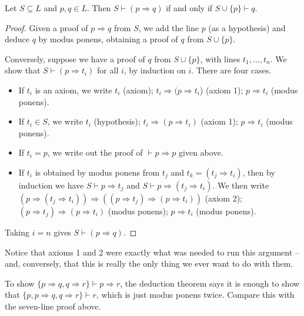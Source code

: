 \begin{theorem}\label{thm:deduction}
  Let $S \subseteq L$ and $p, q \in L$. Then $S \vdash (p \Rightarrow q)$ if and only if $S \cup \{p\} \vdash q$.
\end{theorem}
\begin{proof}
Given a proof of $p \Rightarrow q$ from $S$, we add the line $p$ (as a hypothesis) and deduce $q$ by modus ponens, obtaining a proof of $q$ from $S \cup \{p\}$.

Conversely, suppose we have a proof of $q$ from $S \cup\{p\}$, with lines $t_1, \ldots, t_n$. We show that $S \vdash (p \Rightarrow t_i)$ for all $i$, by induction on $i$. There are four cases.
\begin{itemize}
  \item If $t_i$ is an axiom, we write $t_i$ (axiom); $t_i \Rightarrow(p \Rightarrow t_i$) (axiom 1); $p \Rightarrow t_i$ (modus ponens).
  \item If $t_i \in S$, we write $t_i$ (hypothesis); $t_i \Rightarrow(p \Rightarrow t_i)$ (axiom 1); $p \Rightarrow t_i$ (modus ponens).
  \item If $t_i = p$, we write out the proof of $\vdash p \Rightarrow p$ given above.
  \item If $t_i$ is obtained by modus ponens from $t_j$ and $t_k = (t_j \Rightarrow t_i)$, then by induction we have $S \vdash p \Rightarrow t_j$ and $S \vdash p \Rightarrow (t_j \Rightarrow t_i)$. We then write
  $\left(p \Rightarrow\left(t_j \Rightarrow t_i\right)\right) \Rightarrow\left(\left(p \Rightarrow t_j\right) \Rightarrow\left(p \Rightarrow t_i\right)\right)$ (axiom 2); $\left(p \Rightarrow t_j\right) \Rightarrow\left(p \Rightarrow t_i\right)$ (modus ponens); $p \Rightarrow t_i$ (modus ponens).
\end{itemize}
Taking $i = n$ gives $S \vdash (p \Rightarrow q)$.
\end{proof}

Notice that axioms 1 and 2 were exactly what was needed to run this argument -- and, conversely, that this is really the only thing we ever want to do with them.

\begin{example}
  To show $\{p \Rightarrow q, q \Rightarrow r\} \vdash p \Rightarrow r$, the deduction theorem says it is enough to show that $\{p, p\Rightarrow q, q \Rightarrow r\} \vdash r$, which is just modus ponens twice. Compare this with the seven-line proof above.
\end{example}

